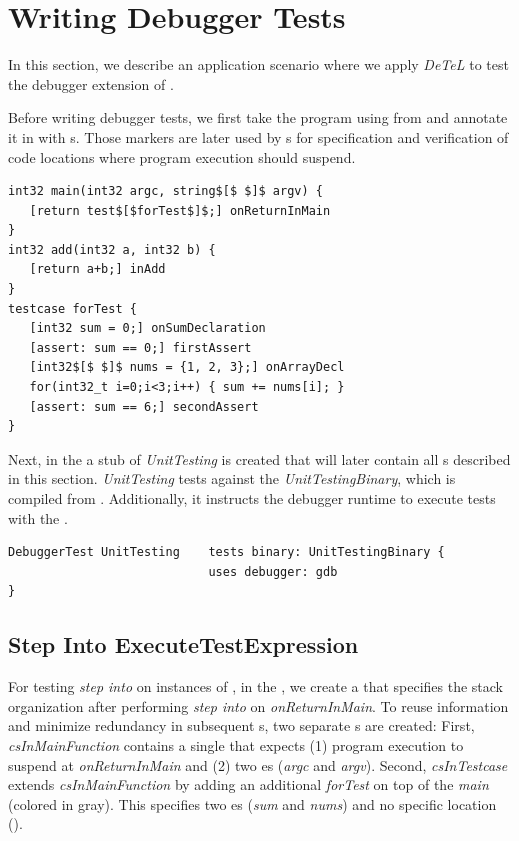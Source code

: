 \section{Writing Debugger Tests}

In this section, we describe an application scenario where we apply \emph{DeTeL}  
to test the debugger extension of . 

Before writing debugger tests, we first take the program using 
from  and annotate it in 
with s. Those markers are later used by s 
for specification and verification of code locations where program
execution should suspend.

\begin{lstlisting}[language=markerDSL,caption=Annotated
program,label=lst:annotatedProg] 
int32 main(int32 argc, string$[$ $]$ argv) {
   [return test$[$forTest$]$;] onReturnInMain
}
int32 add(int32 a, int32 b) {
   [return a+b;] inAdd
}
testcase forTest {
   [int32 sum = 0;] onSumDeclaration
   [assert: sum == 0;] firstAssert
   [int32$[$ $]$ nums = {1, 2, 3};] onArrayDecl
   for(int32_t i=0;i<3;i++) { sum += nums[i]; }
   [assert: sum == 6;] secondAssert
}
\end{lstlisting}	

Next, in the  a stub of 
\emph{UnitTesting} is created that will later contain all s described in this
section. \emph{UnitTesting} tests against the 
\emph{UnitTestingBinary}, which is compiled from .
Additionally, it instructs the debugger runtime to execute tests with the
.

\begin{lstlisting}[language=testingDSL,caption=\ic{DebuggerTest} stub,
label=lst:DebuggerTestingStub]
DebuggerTest UnitTesting    tests binary: UnitTestingBinary {
                            uses debugger: gdb
}  
\end{lstlisting}

\subsection{Step Into ExecuteTestExpression}

For testing \emph{step into} on instances of ,
in the , we create a  that specifies
the stack organization after performing \emph{step
into} on \emph{onReturnInMain}. To reuse information and 
minimize redundancy in subsequent
s, two separate 
s are created: First, \emph{csInMainFunction} 
contains a single  that expects (1) program execution to suspend
at \emph{onReturnInMain} and (2) two es (\emph{argc} and
\emph{argv}). Second, \emph{csInTestcase} extends \emph{csInMainFunction} by adding an
additional  \emph{forTest} on top of the 
\emph{main} (colored in gray). This  specifies two es
(\emph{sum} and \emph{nums}) and no specific location
().

